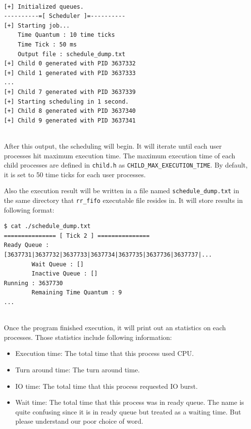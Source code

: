 \documentclass{homework}
\begin{document}
\\
\begin{center}
\begin{code}
\begin{verbatim}
[+] Initialized queues.
----------=[ Scheduler ]=----------
[+] Starting job...
    Time Quantum : 10 time ticks
    Time Tick : 50 ms
    Output file : schedule_dump.txt
[+] Child 0 generated with PID 3637332
[+] Child 1 generated with PID 3637333
...
[+] Child 7 generated with PID 3637339
[+] Starting scheduling in 1 second.
[+] Child 8 generated with PID 3637340
[+] Child 9 generated with PID 3637341
\end{verbatim}
\end{code}
\end{center}
\\
After this output, the scheduling will begin. It will iterate until each user processes hit maximum execution time. The maximum execution time of each child processes are defined in \texttt{child.h} as \texttt{CHILD_MAX_EXECUTION_TIME}. By default, it is set to 50 time ticks for each user processes.

Also the execution result will be written in a file named \texttt{schedule_dump.txt} in the same directory that \texttt{rr_fifo} executable file resides in. It will store results in following format:
\\
\begin{center}
\begin{code}
\begin{verbatim}
$ cat ./schedule_dump.txt
=============== [ Tick 2 ] ===============
Ready Queue : [3637731|3637732|3637733|3637734|3637735|3637736|3637737|...
        Wait Queue : []
        Inactive Queue : []
Running : 3637730
        Remaining Time Quantum : 9
...
\end{verbatim}
\end{code}
\end{center}
\\
Once the program finished execution, it will print out an statistics on each processes. Those statistics include following information:

\begin{itemize}
    \item Execution time: The total time that this process used CPU.
    \item Turn around time: The turn around time.
    \item IO time: The total time that this process requested IO burst.
    \item Wait time: The total time that this process was in ready queue. The name is quite confusing since it is in ready queue but treated as a waiting time. But please understand our poor choice of word.
\end{itemize}
\end{document}

